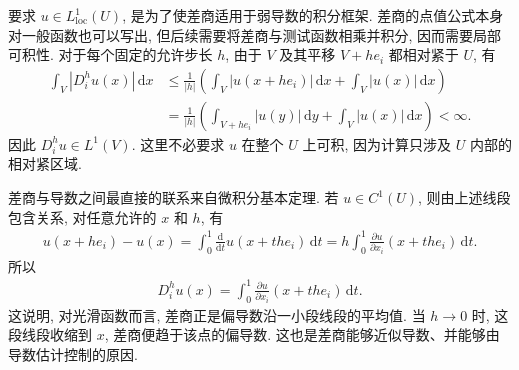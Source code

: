 \documentclass[../../main.tex]{subfiles}
\begin{document}
\begin{remark}
要求 $u\in L_{\mathrm{loc}}^1(U)$, 是为了使差商适用于弱导数的积分框架.
差商的点值公式本身对一般函数也可以写出, 但后续需要将差商与测试函数相乘并积分, 因而需要局部可积性.
对于每个固定的允许步长 $h$, 由于 $V$ 及其平移 $V+he_i$ 都相对紧于 $U$, 有
\begin{align*}
\int_V |D_i^h u(x)|\,\mathrm{d}x
&\leqslant
\frac{1}{|h|}
\left(
\int_V |u(x+he_i)|\,\mathrm{d}x
+
\int_V |u(x)|\,\mathrm{d}x
\right)\\
&=
\frac{1}{|h|}
\left(
\int_{V+he_i}|u(y)|\,\mathrm{d}y
+
\int_V |u(x)|\,\mathrm{d}x
\right)
<\infty.
\end{align*}
因此 $D_i^h u\in L^1(V)$.
这里不必要求 $u$ 在整个 $U$ 上可积, 因为计算只涉及 $U$ 内部的相对紧区域.

差商与导数之间最直接的联系来自微积分基本定理.
若 $u\in C^1(U)$, 则由上述线段包含关系, 对任意允许的 $x$ 和 $h$, 有
\begin{align*}
u(x+he_i)-u(x)
=
\int_0^1
\frac{\mathrm{d}}{\mathrm{d}t}u(x+the_i)\,\mathrm{d}t=
h\int_0^1
\frac{\partial u}{\partial x_i}(x+the_i)\,\mathrm{d}t.
\end{align*}
所以
\begin{align*}
D_i^h u(x)
=
\int_0^1
\frac{\partial u}{\partial x_i}(x+the_i)\,\mathrm{d}t.
\end{align*}
这说明, 对光滑函数而言, 差商正是偏导数沿一小段线段的平均值.
当 $h\to0$ 时, 这段线段收缩到 $x$, 差商便趋于该点的偏导数.
这也是差商能够近似导数、并能够由导数估计控制的原因.


\end{remark}
\end{document}
